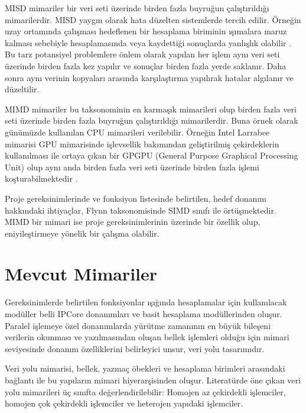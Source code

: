MISD mimariler bir veri seti üzerinde birden fazla buyruğun çalıştırıldığı mimarilerdir. MISD yaygın olarak hata düzelten sistemlerde tercih edilir. Örneğin uzay ortamında çalışması hedeflenen bir hesaplama biriminin ışımalara maruz kalması sebebiyle hesaplamasında veya kaydettiği sonuçlarda yanlışlık olabilir \cite{shivakumar2002modeling}. Bu tarz potansiyel problemlere önlem olarak yapılan her işlem aynı veri seti üzerinde birden fazla kez yapılır ve sonuçlar birden fazla yerde saklanır. Daha sonra aynı verinin kopyaları arasında karşılaştırma yapılırak hatalar algılanır ve düzeltilir. \par

MIMD mimariler bu taksonominin en karmaşık mimarileri olup birden fazla veri seti üzerinde birden fazla buyruğun çalıştırıldığı mimarilerdir. Buna örnek olarak günümüzde kullanılan CPU mimarileri verilebilir. Örneğin Intel Larrabee mimarisi GPU mimarisinde işlevsellik bakımından geliştirilmiş çekirdeklerin kullanılması ile ortaya çıkan bir GPGPU (General Purpose Graphical Processing Unit) olup aynı anda birden fazla veri seti üzerinde birden fazla işlemi koşturabilmektedir \cite{seiler2008larrabee}.\par

Proje gereksinimlerinde ve fonksiyon listesinde belirtilen, hedef donanım hakkındaki ihtiyaçlar, Flynn taksonomisinde SIMD sınıfı ile örtüşmektedir. MIMD bir mimari ise proje gereksinimlerinin üzerinde bir özellik olup, eniyileştirmeye yönelik bir çalışma olabilir.

\section{Mevcut Mimariler}
Gereksinimlerde belirtilen fonksiyonlar ışığında hesaplamalar için kullanılacak modüller belli IPCore donanımları ve basit hesaplama modüllerinden oluşur. Paralel işlemeye özel donanımlarda yürütme zamanının en büyük bileşeni verilerin okunması ve yazılmasından oluşan bellek işlemleri olduğu için mimari seviyesinde donanım özelliklerini belirleyici unsur, veri yolu tasarımıdır.\par

Veri yolu mimarisi, bellek, yazmaç öbekleri ve hesaplama birimleri arasındaki bağlantı ile bu yapıların mimari hiyerarşisinden oluşur. Literatürde öne çıkan veri yolu mimarileri üç sınıfta değerlendirilebilir: Homojen az çekirdekli işlemciler, homojen çok çekirdekli işlemciler ve heterojen yapıdaki işlemciler. \par

